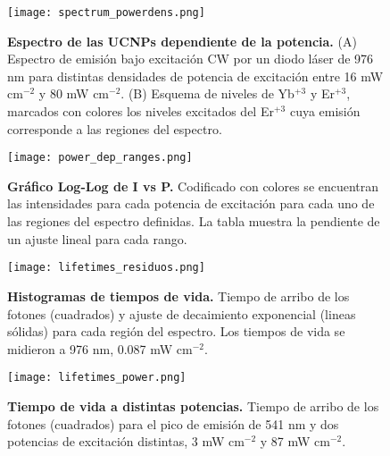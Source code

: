 \begin{figure}
    \centering
    \texttt{[image: spectrum\_powerdens.png]}
    \caption{\textbf{Espectro de las UCNPs dependiente de la potencia.} (A) Espectro de emisión bajo excitación CW por un diodo láser de 976 nm para distintas densidades de potencia de excitación entre 16 mW cm$^{-2}$ y 80 mW cm$^{-2}$.
    (B) Esquema de niveles de Yb$^{+3}$ y Er$^{+3}$, marcados con colores los niveles excitados del Er$^{+3}$ cuya emisión corresponde a las regiones del espectro.}
    \label{fig:power_dep_spectrum}
\end{figure}

\begin{figure}
    \centering
    \texttt{[image: power\_dep\_ranges.png]}
    \caption{\textbf{Gráfico Log-Log de I vs P.} Codificado con colores se encuentran las intensidades para cada potencia de excitación para cada uno de las regiones del espectro definidas. La tabla muestra la pendiente de un ajuste lineal para cada rango.}
    \label{fig:power_dep_ranges}
\end{figure}


\begin{figure}
    \centering
    \texttt{[image: lifetimes\_residuos.png]}
    \caption{\textbf{Histogramas de tiempos de vida.} Tiempo de arribo de los fotones (cuadrados) y ajuste de decaimiento exponencial (lineas sólidas) para cada región del espectro. Los tiempos de vida se midieron a 976 nm, 0.087 mW cm$^{-2}$.}
    \label{fig:lifetimes}
\end{figure}

\begin{SCfigure}
    \centering
    \texttt{[image: lifetimes\_power.png]}
    \caption{\textbf{Tiempo de vida a distintas potencias.} Tiempo de arribo de los fotones (cuadrados) para el pico de emisión de 541 nm y dos potencias de excitación distintas, 3 mW cm$^{-2}$ y 87 mW cm$^{-2}$.}
    \label{fig:lifetimes_power}
\end{SCfigure}

